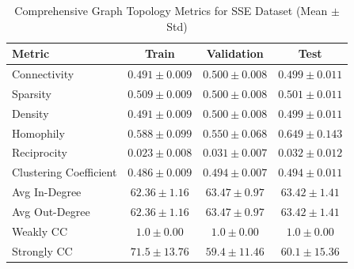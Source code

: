 \begin{table}[H]
    \centering
    \small
    \begin{tabular}{l|ccc}
        \toprule
        \textbf{Metric} & \textbf{Train} & \textbf{Validation} & \textbf{Test} \\
        \midrule
        Connectivity                   & $0.491 \pm 0.009$ & $0.500 \pm 0.008$ & $0.499 \pm 0.011$ \\
        Sparsity                       & $0.509 \pm 0.009$ & $0.500 \pm 0.008$ & $0.501 \pm 0.011$ \\
        Density                        & $0.491 \pm 0.009$ & $0.500 \pm 0.008$ & $0.499 \pm 0.011$ \\
        Homophily                      & $0.588 \pm 0.099$ & $0.550 \pm 0.068$ & $0.649 \pm 0.143$ \\
        Reciprocity                    & $0.023 \pm 0.008$ & $0.031 \pm 0.007$ & $0.032 \pm 0.012$ \\
        Clustering Coefficient         & $0.486 \pm 0.009$ & $0.494 \pm 0.007$ & $0.494 \pm 0.011$ \\
        Avg In-Degree                  & $62.36 \pm 1.16$ & $63.47 \pm 0.97$ & $63.42 \pm 1.41$ \\
        Avg Out-Degree                 & $62.36 \pm 1.16$ & $63.47 \pm 0.97$ & $63.42 \pm 1.41$ \\
        Weakly CC                      & $1.0 \pm 0.00$ & $1.0 \pm 0.00$ & $1.0 \pm 0.00$ \\
        Strongly CC                    & $71.5 \pm 13.76$ & $59.4 \pm 11.46$ & $60.1 \pm 15.36$ \\
        \bottomrule
    \end{tabular}
    \caption{Comprehensive Graph Topology Metrics for SSE Dataset (Mean $\pm$ Std)}
    \label{tab:sse_topology_metrics}
\end{table}